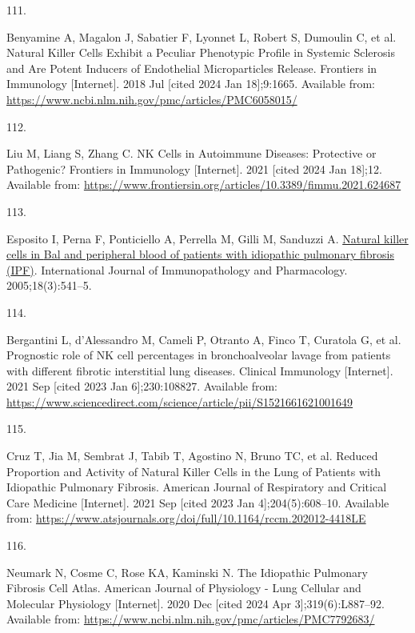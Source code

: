 \documentclass[
]{article}
\newlength{\cslhangindent}
\newlength{\csllabelwidth}
\newlength{\cslentryspacingunit} %
\newenvironment{CSLReferences}[2] %
 {%
  \setlength{\parindent}{0pt}
  \ifodd #1
  \let\oldpar\par
  \def\par{\hangindent=\cslhangindent\oldpar}
  \fi
  \setlength{\parskip}{#2\cslentryspacingunit}
 }%
 {}
\newcommand{\CSLLeftMargin}[1]{\parbox[t]{\csllabelwidth}{#1}}
\newcommand{\CSLRightInline}[1]{\parbox[t]{\linewidth - \csllabelwidth}{#1}\break}
\begin{document}
\begin{CSLReferences}{0}{0}
\leavevmode{}%
\CSLLeftMargin{111. }%
\CSLRightInline{Benyamine A, Magalon J, Sabatier F, Lyonnet L, Robert S, Dumoulin C, et al. Natural {Killer} {Cells} {Exhibit} a {Peculiar} {Phenotypic} {Profile} in {Systemic} {Sclerosis} and {Are} {Potent} {Inducers} of {Endothelial} {Microparticles} {Release}. Frontiers in Immunology {[}Internet{]}. 2018 Jul {[}cited 2024 Jan 18{]};9:1665. Available from: \url{https://www.ncbi.nlm.nih.gov/pmc/articles/PMC6058015/}}

\leavevmode{}%
\CSLLeftMargin{112. }%
\CSLRightInline{Liu M, Liang S, Zhang C. {NK} {Cells} in {Autoimmune} {Diseases}: {Protective} or {Pathogenic}? Frontiers in Immunology {[}Internet{]}. 2021 {[}cited 2024 Jan 18{]};12. Available from: \url{https://www.frontiersin.org/articles/10.3389/fimmu.2021.624687}}

\leavevmode{}%
\CSLLeftMargin{113. }%
\CSLRightInline{Esposito I, Perna F, Ponticiello A, Perrella M, Gilli M, Sanduzzi A. \href{https://doi.org/10.1177/039463200501800314}{Natural killer cells in {Bal} and peripheral blood of patients with idiopathic pulmonary fibrosis ({IPF})}. International Journal of Immunopathology and Pharmacology. 2005;18(3):541--5. }

\leavevmode{}%
\CSLLeftMargin{114. }%
\CSLRightInline{Bergantini L, d'Alessandro M, Cameli P, Otranto A, Finco T, Curatola G, et al. Prognostic role of {NK} cell percentages in bronchoalveolar lavage from patients with different fibrotic interstitial lung diseases. Clinical Immunology {[}Internet{]}. 2021 Sep {[}cited 2023 Jan 6{]};230:108827. Available from: \url{https://www.sciencedirect.com/science/article/pii/S1521661621001649}}

\leavevmode{}%
\CSLLeftMargin{115. }%
\CSLRightInline{Cruz T, Jia M, Sembrat J, Tabib T, Agostino N, Bruno TC, et al. Reduced {Proportion} and {Activity} of {Natural} {Killer} {Cells} in the {Lung} of {Patients} with {Idiopathic} {Pulmonary} {Fibrosis}. American Journal of Respiratory and Critical Care Medicine {[}Internet{]}. 2021 Sep {[}cited 2023 Jan 4{]};204(5):608--10. Available from: \url{https://www.atsjournals.org/doi/full/10.1164/rccm.202012-4418LE}}

\leavevmode{}%
\CSLLeftMargin{116. }%
\CSLRightInline{Neumark N, Cosme C, Rose KA, Kaminski N. The {Idiopathic} {Pulmonary} {Fibrosis} {Cell} {Atlas}. American Journal of Physiology - Lung Cellular and Molecular Physiology {[}Internet{]}. 2020 Dec {[}cited 2024 Apr 3{]};319(6):L887--92. Available from: \url{https://www.ncbi.nlm.nih.gov/pmc/articles/PMC7792683/}}


\end{CSLReferences}
\end{document}
